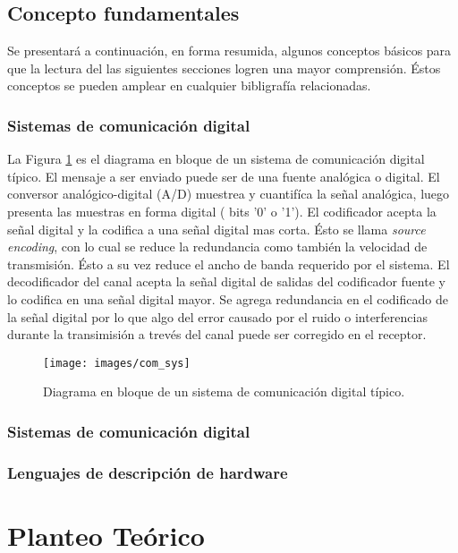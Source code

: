\documentclass[a4paper]{article}
\begin{document}
\subsection{Concepto	fundamentales}
\label{sec:concept}
Se presentará a continuación, en forma resumida, algunos conceptos básicos para que la lectura del las siguientes secciones logren una mayor comprensión. Éstos conceptos se pueden amplear en cualquier bibligrafía relacionadas.
\subsubsection{Sistemas de comunicación digital}
La Figura \ref{fig:com_sys} es el diagrama en bloque de un sistema de comunicación digital típico. El mensaje a ser enviado puede ser de una fuente analógica o digital. El conversor analógico-digital (A/D) muestrea y cuantifíca la señal analógica, luego presenta las muestras en forma digital ( bits '0' o '1'). El codificador acepta la señal digital y la codifica a una señal digital mas corta. Ésto se llama \textsl{source encoding}, con lo cual se reduce la redundancia como también la velocidad de transmisión. Ésto a su vez reduce el ancho de banda requerido por el sistema. El decodificador del canal acepta la señal digital de salidas del codificador fuente y lo codifica en una señal digital mayor. Se agrega redundancia en el codificado de la señal digital por lo que algo del error causado por el ruido o interferencias durante la transimisión a trevés del canal puede ser corregido en el receptor. 
\begin{figure}
  \centering
  \texttt{[image: images/com\_sys]}
  \caption{Diagrama en bloque de un sistema de comunicación digital típico.}
  \label{fig:com_sys}
\end{figure}
\subsubsection{Sistemas de comunicación digital}

\subsubsection{Lenguajes de descripción de hardware}

\section{Planteo Teórico}
\label{sec:teo}
\end{document}
